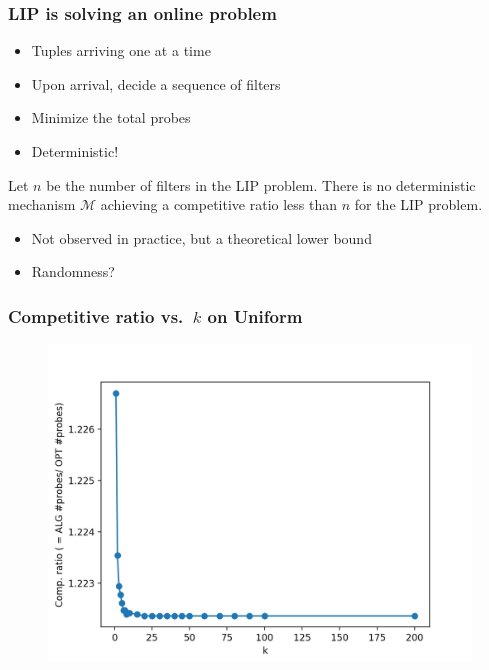 \documentclass{beamer}
\begin{document}
\begin{frame}
\frametitle{LIP is solving an online problem}
\begin{itemize}
  \item Tuples arriving one at a time
  \item Upon arrival, decide a sequence of filters
  \item Minimize the total probes
  \item Deterministic! \pause
\end{itemize}

\begin{theorem}
  Let $n$ be the number of filters in the LIP problem. There is no deterministic mechanism $\mathcal{M}$ achieving a competitive ratio less than $n$ for the \textsc{LIP} problem.
\end{theorem}

\pause
\begin{itemize}
  \item Not observed in practice, but a theoretical lower bound
  \item Randomness?
\end{itemize}

\end{frame}



\begin{frame}
  \frametitle{Competitive ratio vs.\ $k$ on Uniform}
  \begin{figure}
    \centering
    \includegraphics[height=0.7\textheight,keepaspectratio]{cr-k-uniform}
  \end{figure}
\end{frame}
\end{document}
